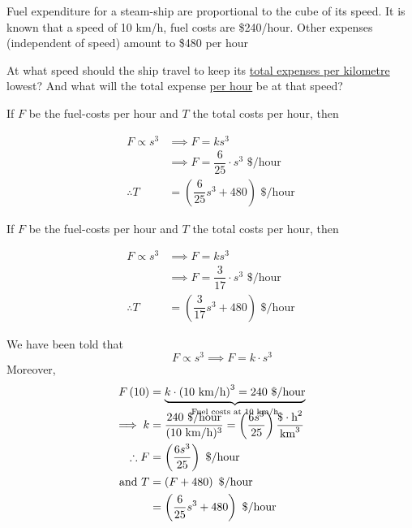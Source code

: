 \documentclass[14pt,fleqn]{extarticle}
\newcommand\dph{\text{ \$/hour}}
\newcommand\kmph{\text{ km/h}}
\newcommand\konst{\left( \frac{6s^3}{25} \right)}
\begin{document}
\begin{question}
\statement
	
Fuel expenditure for a steam-ship are
proportional to the cube of its speed. It is
known that a speed of 10 km/h, fuel costs
are \$240/hour. Other expenses (independent
of speed) amount to \$480 per hour \newline 

At what speed should the ship travel  to keep
its \underline{total expenses per kilometre} lowest? And 
what will the total expense \underline{per hour} be at that speed? 
%
\begin{step}
	\begin{options}
		\correct
      
      If $F$ be the fuel-costs per hour and $T$ the total costs per hour, then 
		
      \begin{align}
        F \propto s^3 &\implies F = ks^3 \\
        &\implies F =  \dfrac{6}{25}\cdot s^3 \dph    \\
        \therefore T &= \left(\dfrac{6}{25}s^3 + 480\right) \dph 
      \end{align}
      

		\incorrect

If $F$ be the fuel-costs per hour and $T$ the total costs per hour, then 
		
      \begin{align}
        F \propto s^3 &\implies F = ks^3 \\
        &\implies F =  \dfrac{3}{17}\cdot s^3 \dph    \\
        \therefore T &= \left(\dfrac{3}{17}s^3 + 480\right) \dph 
      \end{align}

	\end{options}
	\reason

	We have been told that 
	\[\qquad F \propto s^3 \implies F =k\cdot s^3  \]
	Moreover, 
      \begin{align}
        F \left(10 \right) &= \underbrace{k\cdot \left(10 \kmph \right)^3 = 240 \dph}_{\text{Fuel costs at 10\kmph}} \\[-10pt]
        \implies k &= \dfrac{240\dph}{(10 \kmph)^3} = 
        \konst \frac{\$\cdot \text{h}^2}{\text{km}^3}\\
        \therefore F &= \konst\dph \\
        \text{and } T &= \left( F+480\right) \dph \\
        &=\left(\dfrac{6}{25}s^3 + 480\right) \dph
      \end{align}
    

\end{step}
\end{question}
\end{document}
